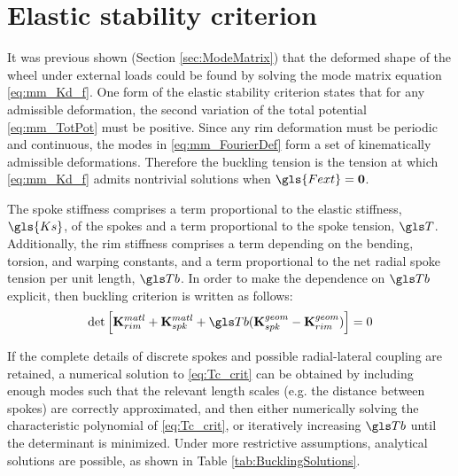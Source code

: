 \documentclass[\rootdir/thesis.tex]{subfiles}
\begin{document}
\section{Elastic stability criterion}
It was previous shown (Section \ref{sec:ModeMatrix}) that the deformed shape of the wheel under external loads could be found by solving the mode matrix equation \eqref{eq:mm_Kd_f}. One form of the elastic stability criterion states that for any admissible deformation, the second variation of the total potential \eqref{eq:mm_TotPot} must be positive. Since any rim deformation must be periodic and continuous, the modes in \eqref{eq:mm_FourierDef} form a set of kinematically admissible deformations. Therefore the buckling tension is the tension at which \eqref{eq:mm_Kd_f} admits nontrivial solutions when $\gls{Fext}=\mathbf{0}$.

The spoke stiffness comprises a term proportional to the elastic stiffness, $\gls{Ks}$, of the spokes and a term proportional to the spoke tension, $\T$. Additionally, the rim stiffness comprises a term depending on the bending, torsion, and warping constants, and a term proportional to the net radial spoke tension per unit length, $\Tb$. In order to make the dependence on $\Tb$ explicit, then buckling criterion is written as follows:
\begin{equation}
\label{eq:Tc_crit}
\det{\left[\matl{\KmRim} + \matl{\KmSpk} + \Tb(\geom{\KmSpk} - \geom{\KmRim})\right]} = 0
\end{equation}

If the complete details of discrete spokes and possible radial-lateral coupling are retained, a numerical solution to \eqref{eq:Tc_crit} can be obtained by including enough modes such that the relevant length scales (e.g. the distance between spokes) are correctly approximated, and then either numerically solving the characteristic polynomial of \eqref{eq:Tc_crit}, or iteratively increasing $\Tb$ until the determinant is minimized. Under more restrictive assumptions, analytical solutions are possible, as shown in Table \ref{tab:BucklingSolutions}.
\end{document}
